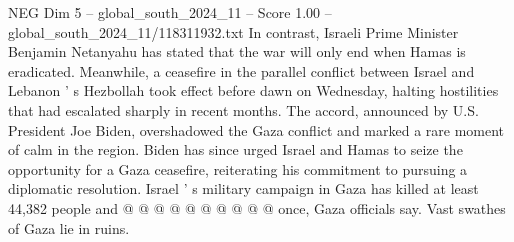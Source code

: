 \begin{textsample}{NEG Dim 5 – global\_south\_2024\_11 – Score 1.00 – global\_south\_2024\_11/118311932.txt}
In contrast, Israeli Prime Minister Benjamin Netanyahu has stated that the war will only end when Hamas is eradicated.
Meanwhile, a ceasefire in the parallel conflict between Israel and Lebanon ' s Hezbollah took effect before dawn on Wednesday, halting hostilities that had escalated sharply in recent months.
The accord, announced by U.S.
President Joe Biden, overshadowed the Gaza conflict and marked a rare moment of calm in the region.
Biden has since urged Israel and Hamas to seize the opportunity for a Gaza ceasefire, reiterating his commitment to pursuing a diplomatic resolution.
Israel ' s military campaign in Gaza has killed at least 44,382 people and @ @ @ @ @ @ @ @ @ @ once, Gaza officials say.
Vast swathes of Gaza lie in ruins.

\end{textsample}
